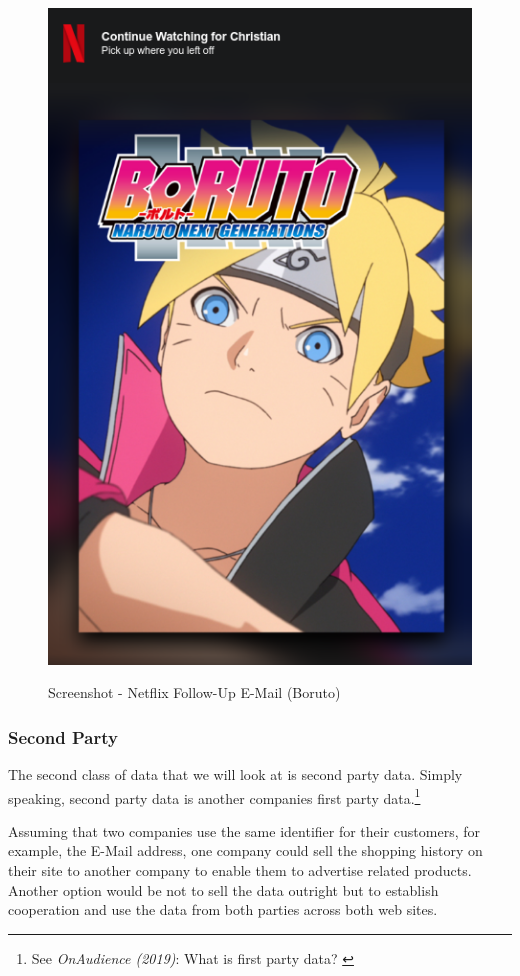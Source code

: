 \begin{figure}[H]
\centering
\caption {Screenshot - Netflix Follow-Up E-Mail (Boruto)}
\includegraphics[scale=0.6]{images/continue-boruto.png}
\label{fig:boruto}
\end{figure}

\subsubsection{Second Party}

The second class of data that we will look at is second party data. Simply speaking, second party data is another companies first party data.\footnote{See \textit{OnAudience (2019)}: What is first party data? \cite{firstParty}}

Assuming that two companies use the same identifier for their customers, for example, the E-Mail address, one company could sell the shopping history on their site to another company to enable them to advertise related products. Another option would be not to sell the data outright but to establish cooperation and use the data from both parties across both web sites.

